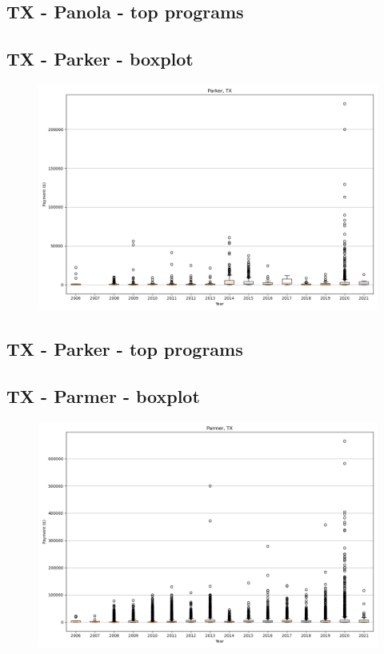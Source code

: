 \subsection*{TX - Panola - top programs}

\newpage
\subsection*{TX - Parker - boxplot}
\begin{figure}[h]
\centering
\includegraphics[width=7in]{../output/boxplots/counties/Parker-TX_boxplot.png}
\end{figure}


\subsection*{TX - Parker - top programs}

\newpage
\subsection*{TX - Parmer - boxplot}
\begin{figure}[h]
\centering
\includegraphics[width=7in]{../output/boxplots/counties/Parmer-TX_boxplot.png}
\end{figure}


